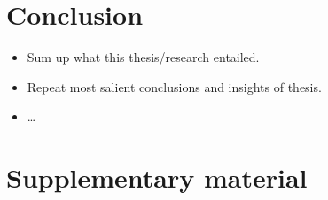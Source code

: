 \documentclass{report}
\begin{document}
\chapter{Conclusion}

\begin{itemize}
    \item Sum up what this thesis/research entailed.
    \item Repeat most salient conclusions and insights of thesis.
    \item \dots
\end{itemize}

\newpage
\singlespacing



\newpage
\doublespacing
\appendix
\chapter{Supplementary material}

\end{document}
